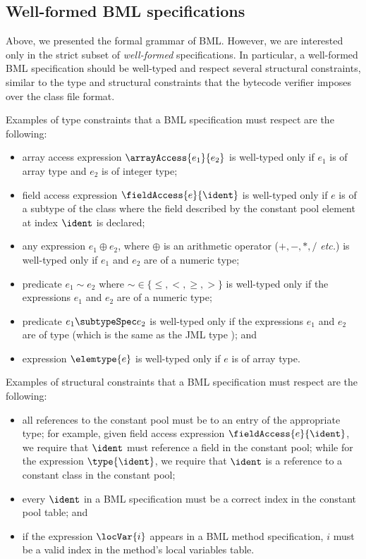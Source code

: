 \subsection{Well-formed BML specifications}
Above, we presented the formal grammar of BML.  However, we are
interested only in the strict subset of \emph{well-formed}
specifications. In particular, a well-formed BML specification should
be well-typed and respect several structural constraints, similar to
the type and structural constraints that the bytecode verifier imposes over the
class file format.

Examples of type constraints that a BML specification must
respect are the following:
\begin{itemize}
\item array access expression
$\arrayAccess{e_1}{e_2}$ is well-typed only if $e_1$ is of array
type and $e_2$ is of integer type;

\item field access expression
    $\fieldAccess{e}{\ident}$ is well-typed only if $e$ is
    of a subtype of the class where the field described by the constant
    pool element at index $\ident$ is declared;

\item any  expression $ e_1 \oplus e_2$, where \(\oplus\) is an arithmetic 
operator (\(+,-,*,/\) \emph{etc.}) is well-typed only if $e_1$ and $
e_2$ are of a numeric type;
    
\item predicate $e_1 \sim e_2$ where $\sim \in \{\leq,<,\geq,
>\}$ is well-typed only if the expressions $e_1$ and $e_2$ are of a 
numeric type;

\item predicate $e_1 \subtypeSpec e_2$ is well-typed only if the 
expressions $e_1$ and $e_ 2$ are of type 
(which is the same as the JML type \TYPE); and

\item expression $\elemtype{e}$ is well-typed only if $e$ is of array type.

	  
\end{itemize}

Examples of structural constraints that a BML specification must
respect are the following: 
\begin{itemize}
\item all references to the constant pool must be to an entry of the
appropriate type; for example, given field access expression
$\fieldAccess{e}{\ident}$, we require that $\ident$ must reference a
field in the constant pool; while for the expression $\type{\ident}$,
we require that \(\ident\) is a reference to a constant class in the
constant pool;
    
\item every $\ident$ in a BML specification must be a correct
index in the constant pool table; and
    
\item if the expression $\locVar{i}$ appears in a BML method 
specification, $i$ must be a valid index in the method's local
variables table.
\end{itemize}

